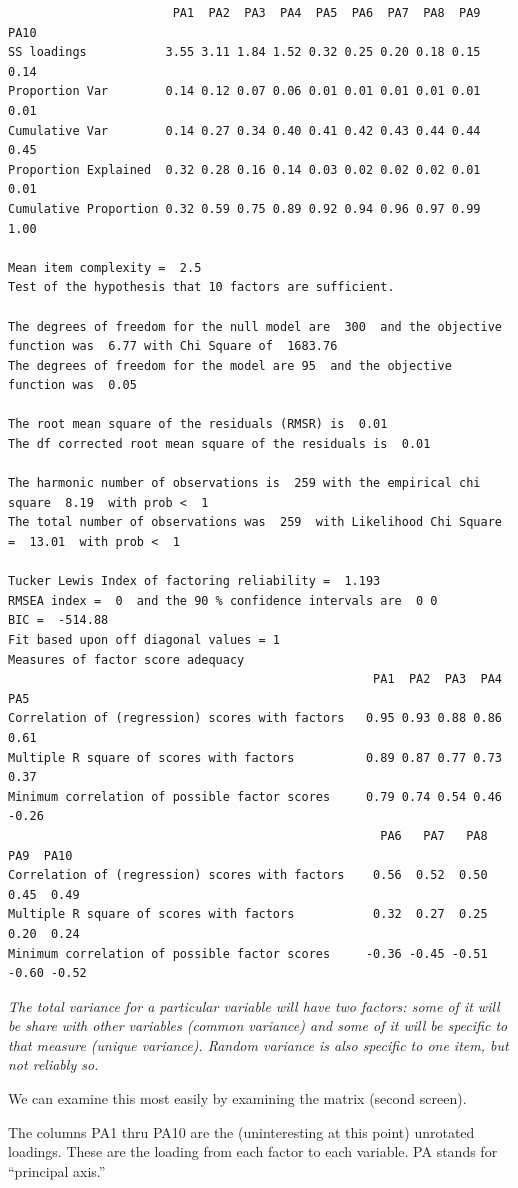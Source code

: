 \documentclass[
  english,
]{book}
\begin{document}
\begin{verbatim}
                       PA1  PA2  PA3  PA4  PA5  PA6  PA7  PA8  PA9 PA10
SS loadings           3.55 3.11 1.84 1.52 0.32 0.25 0.20 0.18 0.15 0.14
Proportion Var        0.14 0.12 0.07 0.06 0.01 0.01 0.01 0.01 0.01 0.01
Cumulative Var        0.14 0.27 0.34 0.40 0.41 0.42 0.43 0.44 0.44 0.45
Proportion Explained  0.32 0.28 0.16 0.14 0.03 0.02 0.02 0.02 0.01 0.01
Cumulative Proportion 0.32 0.59 0.75 0.89 0.92 0.94 0.96 0.97 0.99 1.00

Mean item complexity =  2.5
Test of the hypothesis that 10 factors are sufficient.

The degrees of freedom for the null model are  300  and the objective function was  6.77 with Chi Square of  1683.76
The degrees of freedom for the model are 95  and the objective function was  0.05 

The root mean square of the residuals (RMSR) is  0.01 
The df corrected root mean square of the residuals is  0.01 

The harmonic number of observations is  259 with the empirical chi square  8.19  with prob <  1 
The total number of observations was  259  with Likelihood Chi Square =  13.01  with prob <  1 

Tucker Lewis Index of factoring reliability =  1.193
RMSEA index =  0  and the 90 % confidence intervals are  0 0
BIC =  -514.88
Fit based upon off diagonal values = 1
Measures of factor score adequacy             
                                                   PA1  PA2  PA3  PA4   PA5
Correlation of (regression) scores with factors   0.95 0.93 0.88 0.86  0.61
Multiple R square of scores with factors          0.89 0.87 0.77 0.73  0.37
Minimum correlation of possible factor scores     0.79 0.74 0.54 0.46 -0.26
                                                    PA6   PA7   PA8   PA9  PA10
Correlation of (regression) scores with factors    0.56  0.52  0.50  0.45  0.49
Multiple R square of scores with factors           0.32  0.27  0.25  0.20  0.24
Minimum correlation of possible factor scores     -0.36 -0.45 -0.51 -0.60 -0.52
\end{verbatim}

\emph{The total variance for a particular variable will have two factors: some of it will be share with other variables (common variance) and some of it will be specific to that measure (unique variance). Random variance is also specific to one item, but not reliably so.}

We can examine this most easily by examining the matrix (second screen).

The columns PA1 thru PA10 are the (uninteresting at this point) unrotated loadings. These are the loading from each factor to each variable. PA stands for ``principal axis.''
\end{document}
